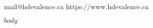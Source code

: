 \documentclass[letterpaper,10pt]{article}
\begin{document}
\pagestyle{empty}

 \\
mail@hdevalence.ca \quad https:/\kern-1.7pt/www.hdevalence.ca

$body$
\end{document}
